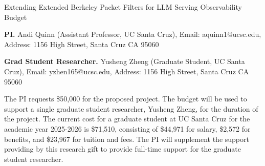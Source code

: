\documentclass[12pt]{article}
\begin{document}
\setcounter{page}{1}

\begin{center}
{\large Extending Extended Berkeley Packet Filters for LLM Serving Observability 
\\
Budget
}
\end{center}


\noindent \textbf{PI.} Andi Quinn (Assistant Professor, UC Santa Cruz), Email: aquinn1@ucsc.edu, Address: 1156 High Street, Santa Cruz CA 95060

\noindent \textbf{Grad Student Researcher.} Yusheng Zheng (Graduate Student, UC Santa Cruz), Email: yzhen165@ucsc.edu, Address: 1156 High Street, Santa Cruz CA 95060

\vspace{2em}
The PI requests \$50,000 for the proposed project.  The budget will be used to support a single graduate student researcher, Yusheng Zheng, for the duration of the project.  The current cost for a graduate student at UC Santa Cruz for the academic year 2025-2026 is \$71,510, consisting of \$44,971 for salary, \$2,572 for benefits, and \$23,967 for tuition and fees.  The PI will supplement the support providing by this research gift to provide full-time support for the graduate student researcher.


% 
% 
% 
% 
% 

%
\end{document}
